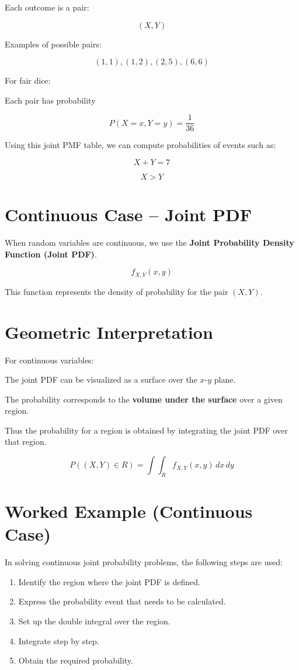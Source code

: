\documentclass[12pt]{article}
\begin{document}
Each outcome is a pair:

\[
(X,Y)
\]

Examples of possible pairs:

\[
(1,1), (1,2), (2,5), (6,6)
\]

For fair dice:

Each pair has probability

\[
P(X=x,Y=y)=\frac{1}{36}
\]

Using this joint PMF table, we can compute probabilities of events such as:

\[
X+Y=7
\]

\[
X>Y
\]

\section{Continuous Case -- Joint PDF}

When random variables are continuous, we use the \textbf{Joint Probability Density Function (Joint PDF)}.

\[
f_{X,Y}(x,y)
\]

This function represents the density of probability for the pair $(X,Y)$.

\section{Geometric Interpretation}

For continuous variables:

The joint PDF can be visualized as a surface over the $x$-$y$ plane.

The probability corresponds to the \textbf{volume under the surface} over a given region.

Thus the probability for a region is obtained by integrating the joint PDF over that region.

\[
P((X,Y)\in R)=\int\int_R f_{X,Y}(x,y)\,dx\,dy
\]

\section{Worked Example (Continuous Case)}

In solving continuous joint probability problems, the following steps are used:

\begin{enumerate}
\item Identify the region where the joint PDF is defined.
\item Express the probability event that needs to be calculated.
\item Set up the double integral over the region.
\item Integrate step by step.
\item Obtain the required probability.
\end{enumerate}
\end{document}
